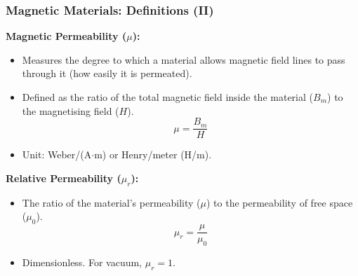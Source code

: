 \transfade[duration=0.5]

\begin{frame}[t]
    \frametitle{\textcolor{deepnavy}{\textbf{Magnetic Materials: Definitions (II)}}}
    \renewcommand{\familydefault}{\rmdefault}
    \small

      \item<+-> \textbf{Magnetic Permeability ($\mu$):}
        \begin{itemize}
              \item Measures the degree to which a material allows magnetic field lines to pass through it (how easily it is permeated).
              \item Defined as the ratio of the total magnetic field inside the material ($B_m$) to the magnetising field ($H$).
              \begin{equation*} \mu = \frac{B_m}{H} \end{equation*}
              \item Unit: Weber/(A$\cdot$m) or Henry/meter (H/m).
        \end{itemize}

      \item<+-> \textbf{Relative Permeability ($\mu_r$):}
        \begin{itemize}
              \item The ratio of the material's permeability ($\mu$) to the permeability of free space ($\mu_0$).
            \begin{equation*} \mu_r = \frac{\mu}{\mu_0} \end{equation*}
              \item Dimensionless.   For vacuum, $\mu_r = 1$.
        \end{itemize}


\end{frame}
